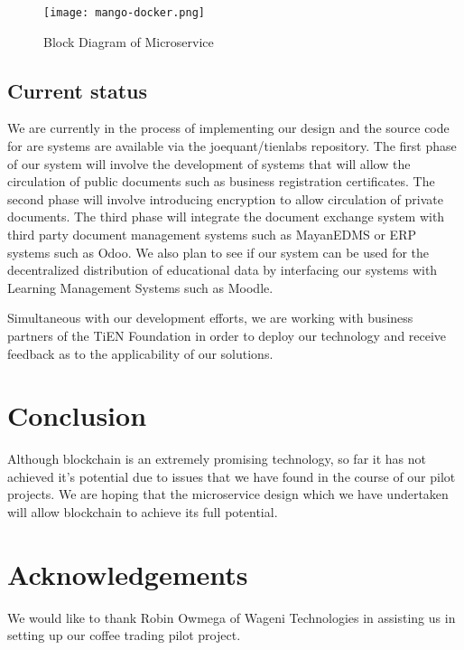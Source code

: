 \documentclass[journal]{IEEEtran}
\begin{document}
\begin{comment}
@startuml

package "Docker Image" {
  [GraphJS API]
  [Git Repository]
  [Mango Interface]
}

cloud {
  [Ethereum Blockchain]
}

cloud {
  [IPFS Data Store]
}

[Document] --> [GraphJS API]
[GraphJS API] --> [Git Repository]
[Git Repository] --> [Mango Interface]
[Mango Interface] --> [Ethereum Blockchain]
[Mango Interface] --> [IPFS Data Store]

@enduml
\end{comment}
\begin{figure}
  \texttt{[image: mango-docker.png]}
  \caption{Block Diagram of Microservice}
\end{figure}

\subsection{Current status}

We are currently in the process of implementing our design and the
source code for are systems are available via the joequant/tienlabs
repository.  The first phase of our system will involve the
development of systems that will allow the circulation of public
documents such as business registration certificates.  The second
phase will involve introducing encryption to allow circulation of
private documents.  The third phase will integrate the document
exchange system with third party document management systems such as
MayanEDMS or ERP systems such as Odoo.  We also plan to see if our
system can be used for the decentralized distribution of educational
data by interfacing our systems with Learning Management Systems such
as Moodle.

Simultaneous with our development efforts, we are working with
business partners of the TiEN Foundation in order to deploy our
technology and receive feedback as to the applicability of our
solutions.

\section{Conclusion}
Although blockchain is an extremely promising technology, so far it
has not achieved it's potential due to issues that we have found in
the course of our pilot projects.  We are hoping that the microservice
design which we have undertaken will allow blockchain to achieve its
full potential.

\section{Acknowledgements}
We would like to thank Robin Owmega of Wageni Technologies in
assisting us in setting up our coffee trading pilot project.

\printbibliography
\end{document}
